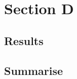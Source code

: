 \section*{Section D}
\label{sec:Section D}
\FloatBarrier %


\subsection*{Results}


\subsection*{Summarise}